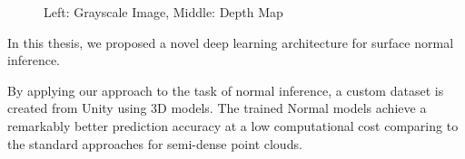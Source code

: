 \begin{figure}[!h]
	\centering
	\caption{Left: Grayscale Image, Middle: Depth Map}
	\label{fig:improved_normal_inference}
\end{figure}


In this thesis, we proposed a novel deep learning architecture for surface normal inference. 

By applying our approach to the task of normal inference, a custom dataset is created from Unity using 3D models. The trained Normal models achieve a remarkably better prediction accuracy at a low computational cost comparing to the standard approaches for semi-dense point clouds. 




















